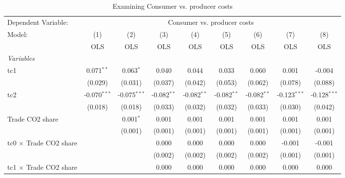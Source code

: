 
\begin{table}[htbp]
   \caption{Examining Consumer vs. producer costs}
   \centering
   \begin{tabular}{lcccccccc}
      \toprule
      Dependent Variable: & \multicolumn{8}{c}{Consumer vs. producer costs}\\
      Model:                                  & (1)            & (2)            & (3)           & (4)           & (5)           & (6)           & (7)            & (8)\\  
                                              &  OLS           & OLS            & OLS           & OLS           & OLS           & OLS           & OLS            & OLS\\  
      \midrule
      \emph{Variables}\\
      tc1                                     & 0.071$^{**}$   & 0.063$^{*}$    & 0.040         & 0.044         & 0.033         & 0.060         & 0.001          & -0.004\\   
                                              & (0.029)        & (0.031)        & (0.037)       & (0.042)       & (0.053)       & (0.062)       & (0.078)        & (0.088)\\   
      tc2                                     & -0.070$^{***}$ & -0.075$^{***}$ & -0.082$^{**}$ & -0.082$^{**}$ & -0.082$^{**}$ & -0.082$^{**}$ & -0.123$^{***}$ & -0.128$^{***}$\\   
                                              & (0.018)        & (0.018)        & (0.033)       & (0.032)       & (0.032)       & (0.033)       & (0.030)        & (0.042)\\   
      Trade CO2 share                         &                & 0.001$^{*}$    & 0.001         & 0.001         & 0.001         & 0.001         & 0.001          & 0.001\\   
                                              &                & (0.001)        & (0.001)       & (0.001)       & (0.001)       & (0.001)       & (0.001)        & (0.001)\\   
      tc0 $\times$ Trade CO2 share            &                &                & 0.000         & 0.000         & 0.000         & 0.000         & -0.001         & -0.001\\   
                                              &                &                & (0.002)       & (0.002)       & (0.002)       & (0.002)       & (0.001)        & (0.001)\\   
      tc1 $\times$ Trade CO2 share            &                &                & 0.000         & 0.000         & 0.000         & 0.000         & 0.000          & 0.000\\   

\end{tabular}
\end{table}
